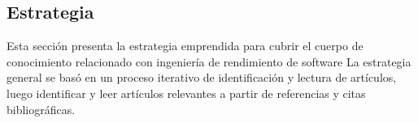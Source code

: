 \documentclass[11pt, twoside]{report}
\begin{document}
%
%
%
%



\subsection{Estrategia}
Esta sección presenta la estrategia emprendida para cubrir el cuerpo de conocimiento relacionado con ingeniería de rendimiento de software La estrategia general se basó en un proceso iterativo de identificación y lectura de artículos, luego identificar y leer artículos relevantes a partir de referencias y citas bibliográficas.
\end{document}
